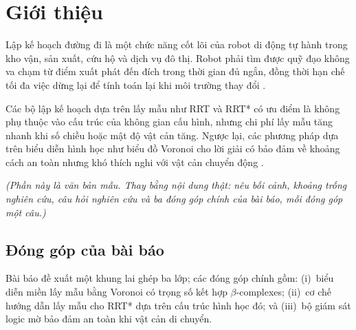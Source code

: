 
\section{Giới thiệu}

Lập kế hoạch đường đi là một chức năng cốt lõi của robot di động tự hành
trong kho vận, sản xuất, cứu hộ và dịch vụ đô thị. Robot phải tìm được
quỹ đạo không va chạm từ điểm xuất phát đến đích trong thời gian đủ ngắn,
đồng thời hạn chế tối đa việc dừng lại để tính toán lại khi môi trường
thay đổi \cite{karnik2021}.

Các bộ lập kế hoạch dựa trên lấy mẫu như RRT và RRT* có ưu điểm là không
phụ thuộc vào cấu trúc của không gian cấu hình, nhưng chi phí lấy mẫu
tăng nhanh khi số chiều hoặc mật độ vật cản tăng. Ngược lại, các phương
pháp dựa trên biểu diễn hình học như biểu đồ Voronoi cho lời giải có bảo
đảm về khoảng cách an toàn nhưng khó thích nghi với vật cản chuyển động
\cite{bhattacharya2017}.

\emph{(Phần này là văn bản mẫu. Thay bằng nội dung thật: nêu bối cảnh,
khoảng trống nghiên cứu, câu hỏi nghiên cứu và ba đóng góp chính của bài
báo, mỗi đóng góp một câu.)}

\subsection{Đóng góp của bài báo}

Bài báo đề xuất một khung lai ghép ba lớp; các đóng góp chính gồm:
(i)~biểu diễn miền lấy mẫu bằng Voronoi có trọng số kết hợp
$\beta$-complexes; (ii)~cơ chế hướng dẫn lấy mẫu cho RRT* dựa trên cấu
trúc hình học đó; và (iii)~bộ giám sát logic mờ bảo đảm an toàn khi vật
cản di chuyển.
